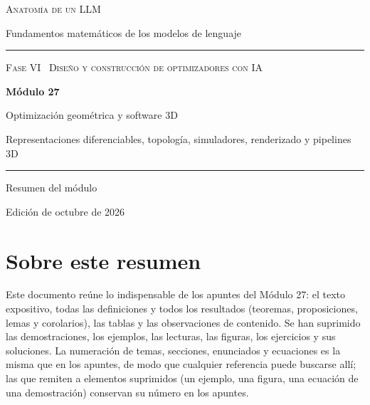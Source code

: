 \documentclass[11pt,a4paper,twoside,openany]{book}
\begin{document}
\frontmatter
\begin{titlepage}
\centering
\vspace*{2.5cm}
{\large\scshape Anatomía de un LLM}\par
\vspace{0.4cm}
{\normalsize Fundamentos matemáticos de los modelos de lenguaje}\par
\vspace{2.2cm}
\rule{\textwidth}{0.8pt}\par\vspace{0.5cm}
{\small\scshape Fase VI \textperiodcentered\ Diseño y construcción de optimizadores con IA}\par\vspace{0.3cm}
{\Huge\bfseries Módulo 27\par}\vspace{0.3cm}
{\LARGE Optimización geométrica y software 3D\par}
\vspace{0.2cm}
{\large Representaciones diferenciables, topología, simuladores, renderizado y pipelines 3D\par}
\vspace{0.5cm}\rule{\textwidth}{0.4pt}\par
\vspace{1.6cm}
{\large Resumen del módulo}\par
\vfill
{\small Edición de octubre de 2026}\par
\end{titlepage}

\chapter*{Sobre este resumen}

Este documento reúne lo indispensable de los apuntes del Módulo 27: el texto expositivo, todas las definiciones y todos los resultados (teoremas, proposiciones, lemas y corolarios), las tablas y las observaciones de contenido. Se han suprimido las demostraciones, los ejemplos, las lecturas, las figuras, los ejercicios y sus soluciones. La numeración de temas, secciones, enunciados y ecuaciones es la misma que en los apuntes, de modo que cualquier referencia puede buscarse allí; las que remiten a elementos suprimidos (un ejemplo, una figura, una ecuación de una demostración) conservan su número en los apuntes.
\end{document}
